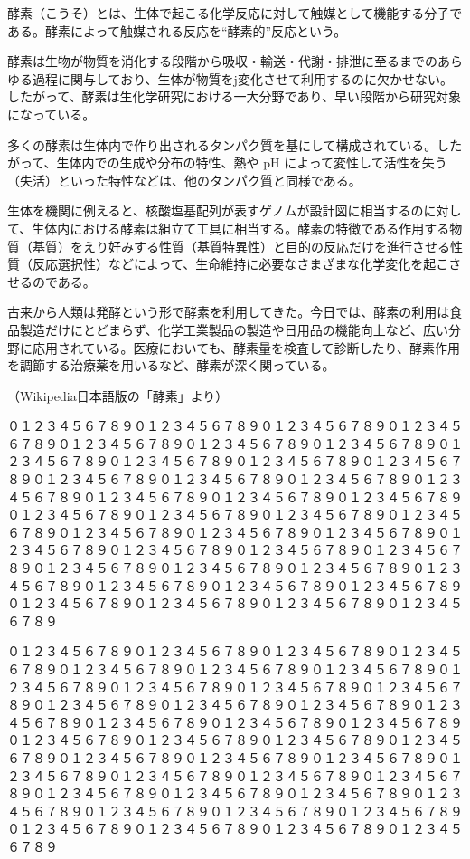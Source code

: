 \documentclass{ltjtarticle}
\begin{document}
酵素（こうそ）とは、生体で起こる化学反応に対して触媒として機能する分子である。酵素によって触媒される反応を“酵素的”反応という。

酵素は生物が物質を消化する段階から吸収・輸送・代謝・排泄に至るまでのあらゆる過程に関与しており、生体が物質をj変化させて利用するのに欠かせない。したがって、酵素は生化学研究における一大分野であり、早い段階から研究対象になっている。

多くの酵素は生体内で作り出されるタンパク質を基にして構成されている。したがって、生体内での生成や分布の特性、熱や pH によって変性して活性を失う（失活）といった特性などは、他のタンパク質と同様である。

生体を機関に例えると、核酸塩基配列が表すゲノムが設計図に相当するのに対して、生体内における酵素は組立て工具に相当する。酵素の特徴である作用する物質（基質）をえり好みする性質（基質特異性）と目的の反応だけを進行させる性質（反応選択性）などによって、生命維持に必要なさまざまな化学変化を起こさせるのである。

古来から人類は発酵という形で酵素を利用してきた。今日では、酵素の利用は食品製造だけにとどまらず、化学工業製品の製造や日用品の機能向上など、広い分野に応用されている。医療においても、酵素量を検査して診断したり、酵素作用を調節する治療薬を用いるなど、酵素が深く関っている。

\leavevmode\hfill  （Wikipedia日本語版の「酵素」より）

\def\R{０１２３４５６７８９０１２３４５６７８９}
\def\S{\R\R\R\R\R\R\R\R\R\R\R\R\R\R\R\R\R\R\R\R\par}

\S\S
\end{document}

